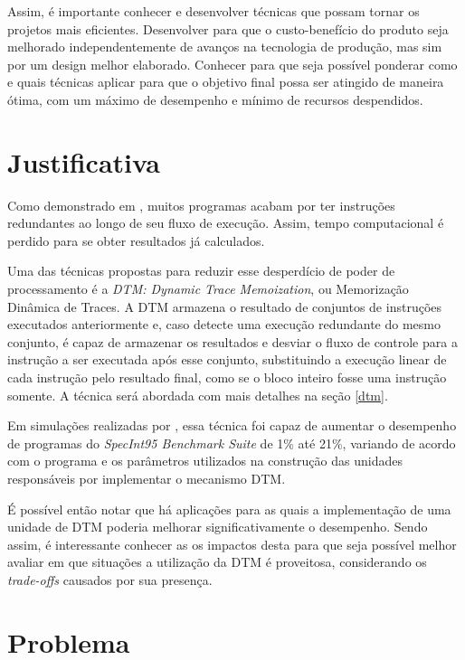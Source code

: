 Assim, é importante conhecer e desenvolver técnicas que possam tornar os projetos mais eficientes. Desenvolver para que o custo-benefício do produto seja melhorado independentemente de avanços na tecnologia de produção, mas sim por um design melhor elaborado. Conhecer para que seja possível ponderar como e quais técnicas aplicar para que o objetivo final possa ser atingido de maneira ótima, com um máximo de desempenho e mínimo de recursos despendidos.



\section{Justificativa}\label{Introducao:Justificativa} %

Como demonstrado em \cite{costa2001explorando}, muitos programas acabam por ter instruções redundantes ao longo de seu fluxo de execução. Assim, tempo computacional é perdido para se obter resultados já calculados.

Uma das técnicas propostas para reduzir esse desperdício de poder de processamento é a \textit{DTM: Dynamic Trace Memoization}, ou Memorização Dinâmica de Traces. A DTM armazena o resultado de conjuntos de instruções executados anteriormente e, caso detecte uma execução redundante do mesmo conjunto, é capaz de armazenar os resultados e desviar o fluxo de controle para a instrução a ser executada após esse conjunto, substituindo a execução linear de cada instrução pelo resultado final, como se o bloco inteiro fosse uma instrução somente. A técnica será abordada com mais detalhes na seção \ref{dtm}.

Em simulações realizadas por \cite{costa2001explorando}, essa técnica foi capaz de aumentar o desempenho de programas do \textit{SpecInt95 Benchmark Suite} de 1\% até 21\%, variando de acordo com o programa e os parâmetros utilizados na construção das unidades responsáveis por implementar o mecanismo DTM.

É possível então notar que há aplicações para as quais a implementação de uma unidade de DTM poderia melhorar significativamente o desempenho. Sendo assim, é interessante conhecer as os impactos desta para que seja possível melhor avaliar em que situações a utilização da DTM é proveitosa, considerando os \textit{trade-offs} causados por sua presença.

\section{Problema}\label{Introducao:Problema}

